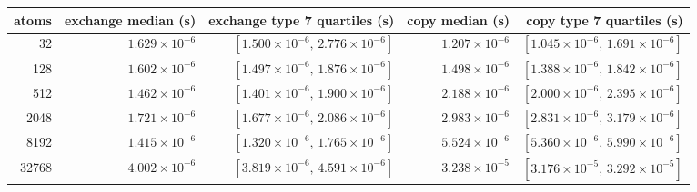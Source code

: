 \begin{tabular}{rrrrr}
\toprule
atoms & exchange median (s) & exchange type 7 quartiles (s) & copy median (s) & copy type 7 quartiles (s) \\
\midrule
32 & $1.629 \times 10^{-6}$ & $[1.500 \times 10^{-6},\,2.776 \times 10^{-6}]$ & $1.207 \times 10^{-6}$ & $[1.045 \times 10^{-6},\,1.691 \times 10^{-6}]$ \\
128 & $1.602 \times 10^{-6}$ & $[1.497 \times 10^{-6},\,1.876 \times 10^{-6}]$ & $1.498 \times 10^{-6}$ & $[1.388 \times 10^{-6},\,1.842 \times 10^{-6}]$ \\
512 & $1.462 \times 10^{-6}$ & $[1.401 \times 10^{-6},\,1.900 \times 10^{-6}]$ & $2.188 \times 10^{-6}$ & $[2.000 \times 10^{-6},\,2.395 \times 10^{-6}]$ \\
2048 & $1.721 \times 10^{-6}$ & $[1.677 \times 10^{-6},\,2.086 \times 10^{-6}]$ & $2.983 \times 10^{-6}$ & $[2.831 \times 10^{-6},\,3.179 \times 10^{-6}]$ \\
8192 & $1.415 \times 10^{-6}$ & $[1.320 \times 10^{-6},\,1.765 \times 10^{-6}]$ & $5.524 \times 10^{-6}$ & $[5.360 \times 10^{-6},\,5.990 \times 10^{-6}]$ \\
32768 & $4.002 \times 10^{-6}$ & $[3.819 \times 10^{-6},\,4.591 \times 10^{-6}]$ & $3.238 \times 10^{-5}$ & $[3.176 \times 10^{-5},\,3.292 \times 10^{-5}]$ \\
\bottomrule
\end{tabular}
